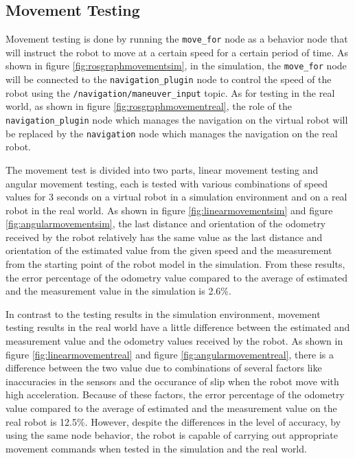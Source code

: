 \subsection{Movement Testing}
\label{subsec:movementtesting}




Movement testing is done by running the \lstinline{move_for} node as a behavior node that will instruct the robot to move at a certain speed for a certain period of time.
As shown in figure \ref{fig:rosgraphmovementsim},
  in the simulation,
  the \lstinline{move_for} node will be connected to the \lstinline{navigation_plugin} node to control the speed of the robot using the \lstinline{/navigation/maneuver_input} topic.
As for testing in the real world,
  as shown in figure \ref{fig:rosgraphmovementreal},
  the role of the \lstinline{navigation_plugin} node which manages the navigation on the virtual robot will be replaced by the \lstinline{navigation} node which manages the navigation on the real robot.




The movement test is divided into two parts,
  linear movement testing and angular movement testing,
  each is tested with various combinations of speed values for 3 seconds on a virtual robot in a simulation environment and on a real robot in the real world.
As shown in figure \ref{fig:linearmovementsim} and figure \ref{fig:angularmovementsim},
  the last distance and orientation of the odometry received by the robot relatively has the same value as the last distance and orientation of the estimated value from the given speed and the measurement from the starting point of the robot model in the simulation.
From these results,
  the error percentage of the odometry value compared to the average of estimated and the measurement value in the simulation is 2.6\%.




In contrast to the testing results in the simulation environment,
  movement testing results in the real world have a little difference between the estimated and measurement value and the odometry values received by the robot.
As shown in figure \ref{fig:linearmovementreal} and figure \ref{fig:angularmovementreal},
  there is a difference between the two value due to combinations of several factors like inaccuracies in the sensors and the occurance of slip when the robot move with high acceleration.
Because of these factors,
  the error percentage of the odometry value compared to the average of estimated and the measurement value on the real robot is 12.5\%.
However,
  despite the differences in the level of accuracy,
  by using the same node behavior,
  the robot is capable of carrying out appropriate movement commands when tested in the simulation and the real world.

